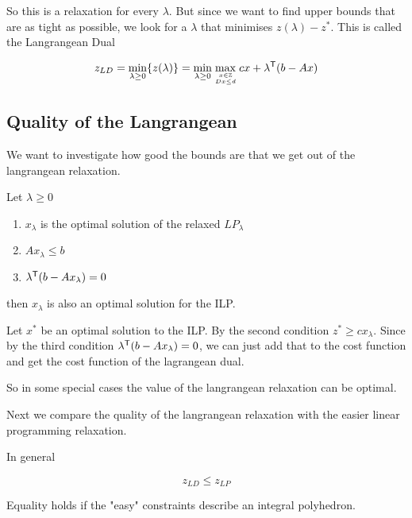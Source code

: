 So this is a relaxation for every $\lambda$. But since we want to find upper bounds that are as tight as possible, we look for a $\lambda$ that minimises $z(\lambda)-z^*$. This is called the Langrangean Dual

\[z_{LD} = \min_{\lambda\geq 0} \{z(\lambda)\} = \min_{\lambda\geq 0} \max_{{x\in \mathbb{Z}}\atop {Dx\leq d}} cx+{\lambda}^\text{\upshape \sffamily T}(b-Ax) \]

\subsection{Quality of the Langrangean}

We want to investigate how good the bounds are that we get out of the langrangean relaxation.

\begin{thm}\label{thm:relaxedOptimal} Let $\lambda \geq 0 $ 

\begin{enumerate}
\item $x_\lambda$ is the optimal solution of the relaxed $LP_\lambda$
\item $Ax_\lambda \leq b$
\item ${\lambda}^\text{\upshape \sffamily T}(b-Ax_\lambda) = 0$
\end{enumerate}

then $x_\lambda$ is also an optimal solution for the ILP.
\end{thm}

\begin{pr} Let $x^*$ be an optimal solution to the ILP. By the second condition $z^*\geq c x_\lambda$. Since by the third condition ${\lambda}^\text{\upshape \sffamily T}(b-Ax_\lambda) = 0$, we can just add that to the cost function and get the cost function of the lagrangean dual.
\end{pr}

So in some special cases the value of the langrangean relaxation can be optimal.

Next we compare the quality of the langrangean relaxation with the easier linear programming relaxation.

\begin{thm} In general

\[z_{LD} \leq z_{LP}\]

Equality holds if the "easy" constraints describe an integral polyhedron.
\end{thm}

